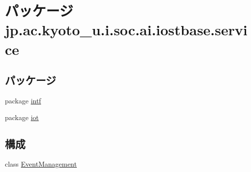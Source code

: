 \hypertarget{namespacejp_1_1ac_1_1kyoto__u_1_1i_1_1soc_1_1ai_1_1iostbase_1_1service}{\section{パッケージ jp.\-ac.\-kyoto\-\_\-u.\-i.\-soc.\-ai.\-iostbase.\-service}
\label{namespacejp_1_1ac_1_1kyoto__u_1_1i_1_1soc_1_1ai_1_1iostbase_1_1service}
}
\subsection*{パッケージ}
\begin{DoxyCompactItemize}
\item 
package \hyperlink{namespacejp_1_1ac_1_1kyoto__u_1_1i_1_1soc_1_1ai_1_1iostbase_1_1service_1_1intf}{intf}
\item 
package \hyperlink{namespacejp_1_1ac_1_1kyoto__u_1_1i_1_1soc_1_1ai_1_1iostbase_1_1service_1_1iot}{iot}
\end{DoxyCompactItemize}
\subsection*{構成}
\begin{DoxyCompactItemize}
\item 
class \hyperlink{classjp_1_1ac_1_1kyoto__u_1_1i_1_1soc_1_1ai_1_1iostbase_1_1service_1_1_event_management}{Event\-Management}
\end{DoxyCompactItemize}
